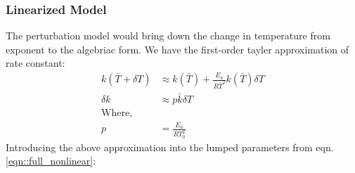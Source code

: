 \subsubsection{Linearized Model}
The perturbation model would bring down the change in
temperature from exponent to the algebriac form. We have the first-order tayler
approximation of rate constant:
\begin{align*}
    k(\bar T + \delta T) &\approx k(\bar T) + \frac{E_a}{R\bar T^2} k(\bar T) \delta T\\
    \delta k &\approx p \bar k \delta T\\
    \text{Where,} \quad &\\
    p &= \frac{E_a}{RT_0^2}
\end{align*}
Introducing the above approximation into the lumped parameters from eqn.\ref{eqn::full_nonlinear}:
